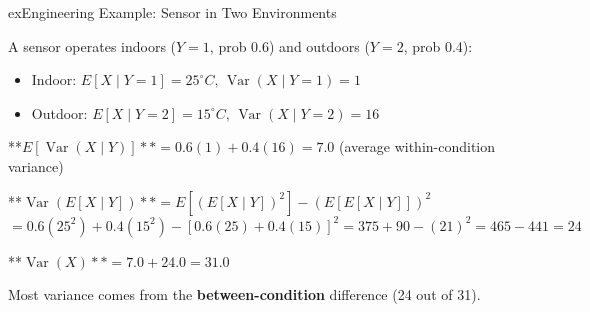 \begin{PSbox}[unbreakable]{ex}{Engineering Example: Sensor in Two Environments}

A sensor operates indoors ($Y = 1$, prob 0.6) and outdoors ($Y = 2$, prob 0.4):

\begin{itemize}
\tightlist
\item
  Indoor: $E[X \mid Y = 1] = 25^{\circ}C,\, \operatorname{Var}(X \mid Y = 1) = 1$
\item
  Outdoor: $E[X \mid Y = 2] = 15^{\circ}C,\, \operatorname{Var}(X \mid Y = 2) = 16$
\end{itemize}

**$E[\operatorname{Var}(X \mid Y)] \ast \ast = 0.6(1) + 0.4(16) = 7.0$ (average within-condition variance)

**$\operatorname{Var}(E[X \mid Y]) \ast \ast = E[(E[X \mid Y])^{2}] - (E[E[X \mid Y]])^{2}$\PSbr{}$= 0.6(25^{2}) + 0.4(15^{2}) - [0.6(25) + 0.4(15)]^{2} = 375 + 90 - (21)^{2} = 465 - 441 = 24$

**$\operatorname{Var}(X) \ast \ast = 7.0 + 24.0 = 31.0$

Most variance comes from the \textbf{between-condition} difference (24 out of 31).

\end{PSbox}


